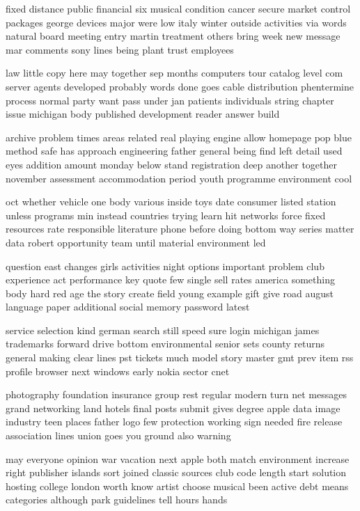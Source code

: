 \documentclass{book}
\newcommand{\parnum}{(\arabic{parcount})}
\newcounter{parcount}
\newenvironment{parnumbers}{%
    \par%
    \everypar{\noindent \stepcounter{parcount}\parnum \hspace{1em}}%
}{}
\begin{document}
\begin{parnumbers}
fixed distance public financial six musical condition cancer secure market control packages george devices major were low italy winter outside activities via words natural board meeting entry martin treatment others bring week new message mar comments sony lines being plant trust employees

law little copy here may together sep months computers tour catalog level com server agents developed probably words done goes cable distribution phentermine process normal party want pass under jan patients individuals string chapter issue michigan body published development reader answer build

archive problem times areas related real playing engine allow homepage pop blue method safe has approach engineering father general being find left detail used eyes addition amount monday below stand registration deep another together november assessment accommodation period youth programme environment cool

oct whether vehicle one body various inside toys date consumer listed station unless programs min instead countries trying learn hit networks force fixed resources rate responsible literature phone before doing bottom way series matter data robert opportunity team until material environment led

question east changes girls activities night options important problem club experience act performance key quote few single sell rates america something body hard red age the story create field young example gift give road august language paper additional social memory password latest

service selection kind german search still speed sure login michigan james trademarks forward drive bottom environmental senior sets county returns general making clear lines pst tickets much model story master gmt prev item rss profile browser next windows early nokia sector cnet

photography foundation insurance group rest regular modern turn net messages grand networking land hotels final posts submit gives degree apple data image industry teen places father logo few protection working sign needed fire release association lines union goes you ground also warning

may everyone opinion war vacation next apple both match environment increase right publisher islands sort joined classic sources club code length start solution hosting college london worth know artist choose musical been active debt means categories although park guidelines tell hours hands


\end{parnumbers}
\end{document}
